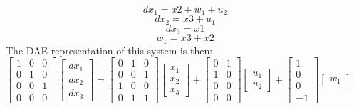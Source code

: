 \begin{equation}
dx_1=x2+w_1+u_2
\end{equation}
\begin{equation}
dx_2=x3+u_1
\end{equation}
\begin{equation}
dx_3=x1
\end{equation}
\begin{equation}
w_1=x3+x2
\end{equation}\newline The DAE representation of this system is then:\\\newline
$
\begin{bmatrix}  1 & 0 & 0 \\ 0 & 1 & 0  \\ 0 & 0 & 1 \\ 0 & 0 & 0   \end{bmatrix}  \left[ \begin{array}{c} dx_1 \\ dx_2 \\ dx_3 \end{array} \right]
= \begin{bmatrix} 0 & 1 & 0 \\ 0 & 0 & 1 \\ 1 & 0 & 0 \\ 0 & 1 & 1 \end{bmatrix}  \left[ \begin{array}{c} x_1 \\ x_2 \\ x_3 \end{array} \right] + \begin{bmatrix} 0 & 1 \\ 1 & 0 \\ 0 & 0 \\ 0 & 0 \end{bmatrix} \left[ \begin{array}{c} u_1 \\ u_2 \end{array} \right]+
\begin{bmatrix} 1 \\ 0 \\ 0  \\ -1 \end{bmatrix} \left[ \begin{array}{c} w_1 \end{array} \right]$\\\newline
